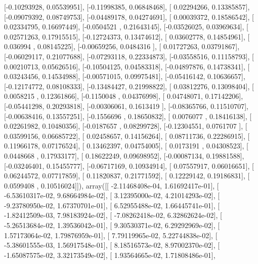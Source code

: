 \documentclass{article}
\begin{document}
       [-0.10293928,  0.05539951],
       [-0.11998385,  0.06848468],
       [ 0.02294266,  0.13385857],
       [-0.09079392,  0.08749753],
       [-0.04489178,  0.04274691],
       [ 0.00039372,  0.18586542],
       [ 0.02334795,  0.16697449],
       [-0.0504521 ,  0.21643145],
       [-0.03526025,  0.03969634],
       [ 0.02571263,  0.17915515],
       [-0.12724373,  0.13474612],
       [ 0.03602778,  0.14854961],
       [ 0.036994  ,  0.08145225],
       [-0.00659256,  0.0484316 ],
       [ 0.01727263,  0.03791867],
       [-0.06029117,  0.21077688],
       [-0.07293118,  0.22334873],
       [-0.03558516,  0.11158793],
       [ 0.00210713,  0.05626516],
       [-0.10504125,  0.04583318],
       [-0.04897876,  0.14738341],
       [ 0.03243456,  0.14534988],
       [-0.00571015,  0.09975481],
       [-0.05416142,  0.10636657],
       [-0.12174772,  0.08108333],
       [-0.13484427,  0.21998822],
       [ 0.03812276,  0.13098404],
       [ 0.0058215 ,  0.12361866],
       [-0.1150048 ,  0.04376998],
       [ 0.04748071,  0.17142206],
       [-0.05441298,  0.20293818],
       [-0.00306061,  0.1613419 ],
       [-0.08365766,  0.11510707],
       [-0.00638416,  0.13557251],
       [-0.1556696 ,  0.18650832],
       [ 0.0076077 ,  0.18416138],
       [ 0.02261982,  0.10480356],
       [-0.0187657 ,  0.08299728],
       [-0.12304551,  0.0761707 ],
       [ 0.03599156,  0.06685722],
       [ 0.02458657,  0.14156264],
       [ 0.08711736,  0.22286915],
       [ 0.11966178,  0.07176524],
       [ 0.13462397,  0.04754005],
       [ 0.0173191 ,  0.04308523],
       [ 0.0448668 ,  0.17933177],
       [ 0.18622249,  0.09698952],
       [-0.00087134,  0.19881588],
       [-0.03246401,  0.15455777],
       [-0.06717169,  0.10934914],
       [ 0.07557917,  0.06016651],
       [ 0.06244572,  0.07717859],
       [ 0.11820837,  0.21771592],
       [ 0.12229142,  0.19186831],
       [ 0.0599408 ,  0.10516024]]), array([[ -2.11468408e-04,   1.61692417e-01],
       [ -6.53610317e-02,   9.68664984e-02],
       [  3.12395000e-02,   4.21014293e-02],
       [ -9.23780950e-02,   1.67370701e-01],
       [  6.52955488e-02,   1.66445741e-01],
       [ -1.82412509e-03,   7.98183924e-02],
       [ -7.08262418e-02,   6.32862624e-02],
       [ -5.26513684e-02,   1.39536042e-01],
       [  9.30530371e-02,   6.29292969e-02],
       [  1.57173064e-02,   1.79876959e-01],
       [  7.79119965e-02,   5.22744838e-02],
       [ -5.38601555e-03,   1.56917548e-01],
       [  8.18516573e-02,   8.97002370e-02],
       [ -1.65087575e-02,   3.32173549e-02],
       [  1.93564665e-02,   1.71808486e-01],
\end{document}
